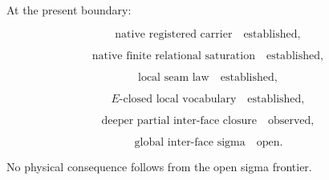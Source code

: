 At the present boundary:

\[
\text{native registered carrier}
\quad
\text{established},
\]

\[
\text{native finite relational saturation}
\quad
\text{established},
\]

\[
\text{local seam law}
\quad
\text{established},
\]

\[
E\text{-closed local vocabulary}
\quad
\text{established},
\]

\[
\text{deeper partial inter-face closure}
\quad
\text{observed},
\]

\[
\text{global inter-face sigma}
\quad
\text{open}.
\]

No physical consequence follows from the open sigma frontier.
